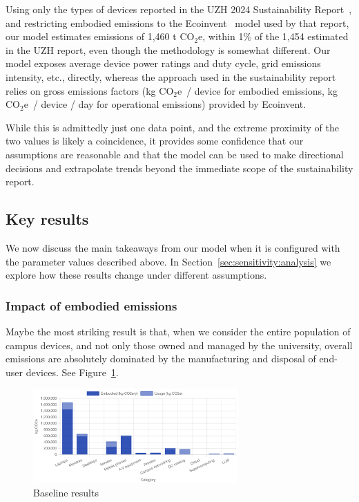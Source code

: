 \documentclass[11pt]{article}
\newcommand{\coe}{CO$_2$e}
\newcommand{\gcoe}{g \coe}
\newcommand{\tcoe}{t \coe}
\newcommand{\kgcoe}{k\gcoe}
\begin{document}
Using only the types of devices reported in the UZH 2024 Sustainability Report~\cite{uzh:sustainability:report}, and restricting embodied emissions to the Ecoinvent~\cite{ecoinvent} model used by that report, our model estimates emissions of 1,460 \tcoe, within 1\% of the 1,454 estimated in the UZH report, even though the methodology is somewhat different. Our model exposes average device power ratings and duty cycle, grid emissions intensity, etc., directly, whereas the approach used in the sustainability report relies on gross emissions factors (\kgcoe\ / device for embodied emissions, \kgcoe\ / device / day for operational emissions) provided by Ecoinvent.

While this is admittedly just one data point, and the extreme proximity of the two values is likely a coincidence, it provides some confidence that our assumptions are reasonable and that the model can be used to make directional decisions and extrapolate trends beyond the immediate scope of the sustainability report.

\subsection{Key results}

We now discuss the main takeaways from our model when it is configured with the parameter values described above. In Section~\ref{sec:sensitivity:analysis} we explore how these results change under different assumptions.

\subsubsection*{Impact of embodied emissions}

Maybe the most striking result is that, when we consider the entire population of campus devices, and not only those owned and managed by the university, overall emissions are absolutely dominated by the manufacturing and disposal of end-user devices. See Figure~\ref{fig:baseline}.

\begin{figure}[h]
  \centering
  \includegraphics[width=0.7\textwidth]{fig-baseline.png}
  \caption{Baseline results}
  \label{fig:baseline}
\end{figure}
\end{document}
